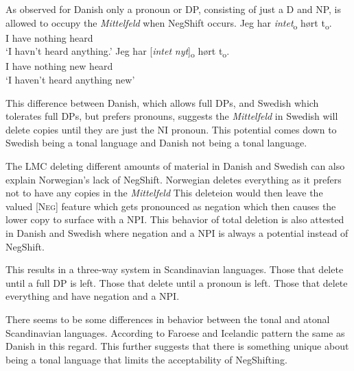 \documentclass[12pt, letterpaper]{article}
\begin{document}
\ex As observed for Danish only a pronoun or DP, consisting of just a D and NP, is allowed to occupy the \emph{Mittelfeld} when NegShift occurs. 
	\ea 
	\gll Jeg har \textit{intet}\textsubscript{o} hørt t\textsubscript{o}.\\
	I have nothing heard\\
	\glt  `I havn't heard anything.'
	\ex 
	\gll Jeg har [\textit{intet} \textit{nyt}]\textsubscript{o} hørt t\textsubscript{o}.\\
	I have nothing new heard\\
	\glt `I haven't heard anything new'
	\z  	

\ex This difference between Danish, which allows full DPs, and Swedish which tolerates full DPs, but prefers pronouns, suggests the \emph{Mittelfeld} in Swedish will delete copies until they are just the NI pronoun. 
	\ea This potential comes down to Swedish being a tonal language and Danish not being a tonal language.
	\z 

\ex The LMC deleting different amounts of material in Danish and Swedish can also explain Norwegian's lack of NegShift. 
	\ea Norwegian deletes everything as it prefers not to have any copies in the \emph{Mittelfeld}
	\ex This deleteion would then leave the valued [\textsc{Neg}] feature which gets pronounced as negation which then causes the lower copy to surface with a NPI.  
	\ex This behavior of total deletion is also attested in Danish and Swedish where negation and a NPI is always a potential instead of NegShift.
	\z  

\ex This results in a three-way system in Scandinavian languages. 
	\ea Those that delete until a full DP is left.
	\ex Those that delete until a pronoun is left.
	\ex Those that delete everything and have negation and a NPI.
	\z 

\ex There seems to be some differences in behavior between the tonal and atonal Scandinavian languages. 
	\ea According to \citet{thrainssonFaroeseOverviewReference2004,thrainssonSyntaxIcelandic2010} Faroese and Icelandic pattern the same as Danish in this regard. 
	\ex This further suggests that there is something unique about being a tonal language that limits the acceptability of NegShifting. 
	\z 
\end{document}
